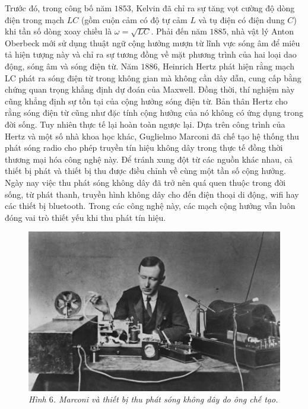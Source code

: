 \begin{multicols}{2}
	\vskip 0.1cm
	Trước đó, trong công bố năm $1853$, Kelvin đã chỉ ra sự tăng vọt cường độ dòng điện trong mạch $LC$ (gồm cuộn cảm có độ tự cảm $L$ và tụ điện có điện dung $C$) khi tần số dòng xoay chiều là $\omega =\sqrt{LC}$. Phải đến năm $1885$, nhà vật lý Anton Oberbeck mới sử dụng thuật ngữ cộng hưởng mượn từ lĩnh vực sóng âm để miêu tả hiện tượng này và chỉ ra sự tương đồng về mặt phương trình của hai loại dao động, sóng âm và sóng điện từ. 
	\vskip 0.1cm
	Năm $1886$, Heinrich Hertz phát hiện rằng mạch LC phát ra sóng điện từ trong không gian mà không cần dây dẫn, cung cấp bằng chứng quan trọng khẳng định dự đoán của Maxwell. Đồng thời, thí nghiệm này cũng khẳng định sự tồn tại của cộng hưởng sóng điện từ.
	\vskip 0.1cm
	Bản thân Hertz cho rằng sóng điện từ cũng như đặc tính cộng hưởng của nó không có ứng dụng trong đời sống. Tuy nhiên thực tế lại hoàn toàn ngược lại. Dựa trên công trình của Hertz và một số nhà khoa học khác, Guglielmo Marconi đã chế tạo hệ thống thu phát sóng radio cho phép truyền tín hiệu không dây trong thực tế đồng thời thương mại hóa công nghệ này. Để tránh xung đột từ các nguồn khác nhau, cả thiết bị phát và thiết bị thu được điều chỉnh về cùng một tần số cộng hưởng. Ngày nay việc thu phát sóng không dây đã trở nên quá quen thuộc trong đời sống, từ phát thanh, truyền hình không dây cho đến điện thoại di động, wifi hay các thiết bị bluetooth. Trong các công nghệ này, các mạch cộng hưởng vẫn luôn đóng vai trò thiết yếu khi thu phát tín hiệu.
		\begin{figure}[H]
		\centering
		\vspace*{-5pt}
		\captionsetup{labelformat= empty, justification=centering}
		\includegraphics[width=1\linewidth]{8}
		\caption{\small\textit{\color{timhieukhoahoc}Hình $6$. Marconi và thiết bị thu phát sóng không dây do ông chế tạo.}}

\end{figure}
\end{multicols}
